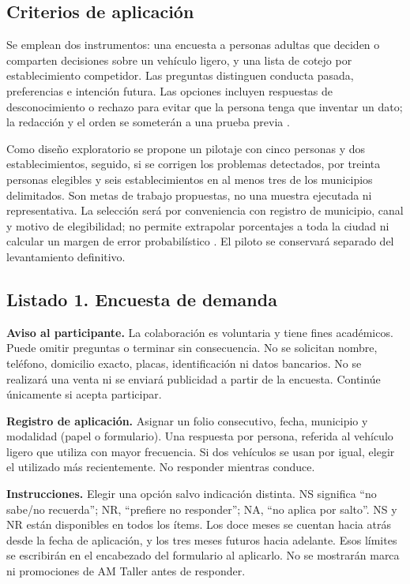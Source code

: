 {\subsection{Criterios de aplicación}
Se emplean dos instrumentos: una encuesta a personas adultas que deciden o comparten decisiones sobre un vehículo ligero, y una lista de cotejo por establecimiento competidor. Las preguntas distinguen conducta pasada, preferencias e intención futura. Las opciones incluyen respuestas de desconocimiento o rechazo para evitar que la persona tenga que inventar un dato; la redacción y el orden se someterán a una prueba previa \citep{pewDisenoPreguntas,aaporBuenasPracticas2022}.

Como diseño exploratorio se propone un pilotaje con cinco personas y dos establecimientos, seguido, si se corrigen los problemas detectados, por treinta personas elegibles y seis establecimientos en al menos tres de los municipios delimitados. Son metas de trabajo propuestas, no una muestra ejecutada ni representativa. La selección será por conveniencia con registro de municipio, canal y motivo de elegibilidad; no permite extrapolar porcentajes a toda la ciudad ni calcular un margen de error probabilístico \citep{albrechtMarketing2023}. El piloto se conservará separado del levantamiento definitivo.

\subsection{Listado 1. Encuesta de demanda}
\textbf{Aviso al participante.} La colaboración es voluntaria y tiene fines académicos. Puede omitir preguntas o terminar sin consecuencia. No se solicitan nombre, teléfono, domicilio exacto, placas, identificación ni datos bancarios. No se realizará una venta ni se enviará publicidad a partir de la encuesta. Continúe únicamente si acepta participar.

\textbf{Registro de aplicación.} Asignar un folio consecutivo, fecha, municipio y modalidad (papel o formulario). Una respuesta por persona, referida al vehículo ligero que utiliza con mayor frecuencia. Si dos vehículos se usan por igual, elegir el utilizado más recientemente. No responder mientras conduce.

\textbf{Instrucciones.} Elegir una opción salvo indicación distinta. NS significa ``no sabe/no recuerda''; NR, ``prefiere no responder''; NA, ``no aplica por salto''. NS y NR están disponibles en todos los ítems. Los doce meses se cuentan hacia atrás desde la fecha de aplicación, y los tres meses futuros hacia adelante. Esos límites se escribirán en el encabezado del formulario al aplicarlo. No se mostrarán marca ni promociones de AM Taller antes de responder.

}
